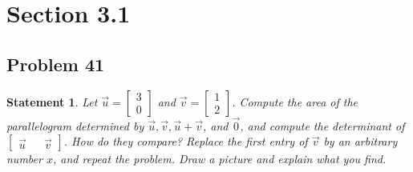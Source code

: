 \documentclass[12pt, letterpaper]{article}
\theoremstyle{statement}
\theoremstyle{statement}
\newtheorem*{atmStat}{Statement}
\begin{document}
    \section*{Section 3.1}
    \subsection*{Problem 41}
    \begin{atmStat}
    Let $\Vec{u}=\begin{bmatrix} 3 \\0 \end{bmatrix}$ and $\Vec{v}= \begin{bmatrix} 1 \\ 2 \end{bmatrix}$. Compute the area of the parallelogram determined by $\Vec{u}, \Vec{v}, \Vec{u}+\Vec{v}$, and $\Vec{0}$, and compute the determinant of $\begin{bmatrix} \Vec{u} && \Vec{v}\end{bmatrix}$. How do they compare? Replace the first entry of $\Vec{v}$ by an arbitrary number $x$, and repeat the problem. Draw a picture and explain what you find.
    \end{atmStat}
\end{document}
